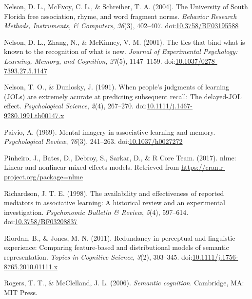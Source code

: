 \documentclass[english,,man]{apa6}
\begin{document}
\leavevmode\hypertarget{ref-Nelson2004}{}%
Nelson, D. L., McEvoy, C. L., \& Schreiber, T. A. (2004). The University of South Florida free association, rhyme, and word fragment norms. \emph{Behavior Research Methods, Instruments, \& Computers}, \emph{36}(3), 402--407. doi:\href{https://doi.org/10.3758/BF03195588}{10.3758/BF03195588}

\leavevmode\hypertarget{ref-Nelson2001}{}%
Nelson, D. L., Zhang, N., \& McKinney, V. M. (2001). The ties that bind what is known to the recognition of what is new. \emph{Journal of Experimental Psychology: Learning, Memory, and Cognition}, \emph{27}(5), 1147--1159. doi:\href{https://doi.org/10.1037/0278-7393.27.5.1147}{10.1037/0278-7393.27.5.1147}

\leavevmode\hypertarget{ref-Nelson1991}{}%
Nelson, T. O., \& Dunlosky, J. (1991). When people's judgments of learning (JOLs) are extremely acurate at predicting subsequent recall: The delayed-JOL effect. \emph{Psychological Science}, \emph{2}(4), 267--270. doi:\href{https://doi.org/10.1111/j.1467-9280.1991.tb00147.x}{10.1111/j.1467-9280.1991.tb00147.x}

\leavevmode\hypertarget{ref-Paivio1969}{}%
Paivio, A. (1969). Mental imagery in associative learning and memory. \emph{Psychological Review}, \emph{76}(3), 241--263. doi:\href{https://doi.org/10.1037/h0027272}{10.1037/h0027272}

\leavevmode\hypertarget{ref-Pinheiro2017}{}%
Pinheiro, J., Bates, D., Debroy, S., Sarkar, D., \& R Core Team. (2017). nlme: Linear and nonlinear mixed effects models. Retrieved from \url{https://cran.r-project.org/package=nlme}

\leavevmode\hypertarget{ref-Richardson1998}{}%
Richardson, J. T. E. (1998). The availability and effectiveness of reported mediators in associative learning: A historical review and an experimental investigation. \emph{Psychonomic Bulletin \& Review}, \emph{5}(4), 597--614. doi:\href{https://doi.org/10.3758/BF03208837}{10.3758/BF03208837}

\leavevmode\hypertarget{ref-Riordan2011}{}%
Riordan, B., \& Jones, M. N. (2011). Redundancy in perceptual and linguistic experience: Comparing feature-based and distributional models of semantic representation. \emph{Topics in Cognitive Science}, \emph{3}(2), 303--345. doi:\href{https://doi.org/10.1111/j.1756-8765.2010.01111.x}{10.1111/j.1756-8765.2010.01111.x}

\leavevmode\hypertarget{ref-Rogers2006}{}%
Rogers, T. T., \& McClelland, J. L. (2006). \emph{Semantic cognition}. Cambridge, MA: MIT Press.
\end{document}
